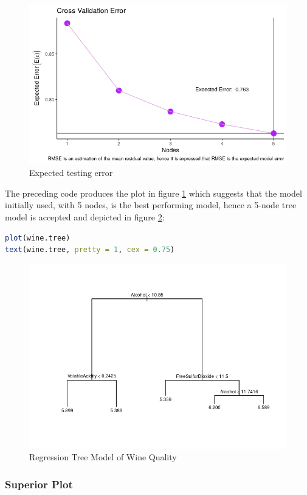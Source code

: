 \documentclass[
]{article}
\begin{document}
\begin{figure}
	\centering
	\includegraphics[width=0.7\linewidth]{SecAssignment_files/figure-html/unnamed-chunk-34-1.png}
	\caption{Expected testing error }
	\label{cvtree}
\end{figure}




The preceding code produces the plot in figure \ref{cvtree} which suggests that the model initially used, with 5 nodes, is the best
performing model, hence a 5-node tree model is accepted and depicted in figure \ref{basetreemodreg}:

\begin{lstlisting}[language=R]
plot(wine.tree)
text(wine.tree, pretty = 1, cex = 0.75)
\end{lstlisting}

\begin{figure}
	\centering
	\includegraphics[width=0.7\linewidth]{SecAssignment_files/figure-html/unnamed-chunk-35-1.png}
	\caption{Regression Tree Model of Wine Quality}
	\label{basetreemodreg}
\end{figure}




\hypertarget{superior-plot}{%
\subsubsection{Superior Plot}\label{superior-plot}}
\end{document}
